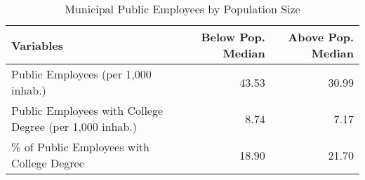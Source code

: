 \documentclass[12pt]{article}
\begin{document}
\begin{table}[htbp]
\centering
\caption{Municipal Public Employees by Population Size} 
\label{tab:public_employees_population}
\begin{adjustbox}{max width=\textwidth}
\begin{threeparttable}
\begin{tabular}{lrr}
  \toprule
  \textbf{Variables} & \textbf{Below Pop. Median} & \textbf{Above Pop. Median} \\ 
  \midrule
  Public Employees (per 1,000 inhab.) & 43.53 & 30.99 \\ 
  \addlinespace
  Public Employees with College Degree (per 1,000 inhab.) & 8.74 & 7.17 \\ 
  \addlinespace
  \% of Public Employees with College Degree & 18.90 & 21.70 \\ 
  \bottomrule
\end{tabular}
\end{threeparttable}
\end{adjustbox}
\end{table}
\end{document}
